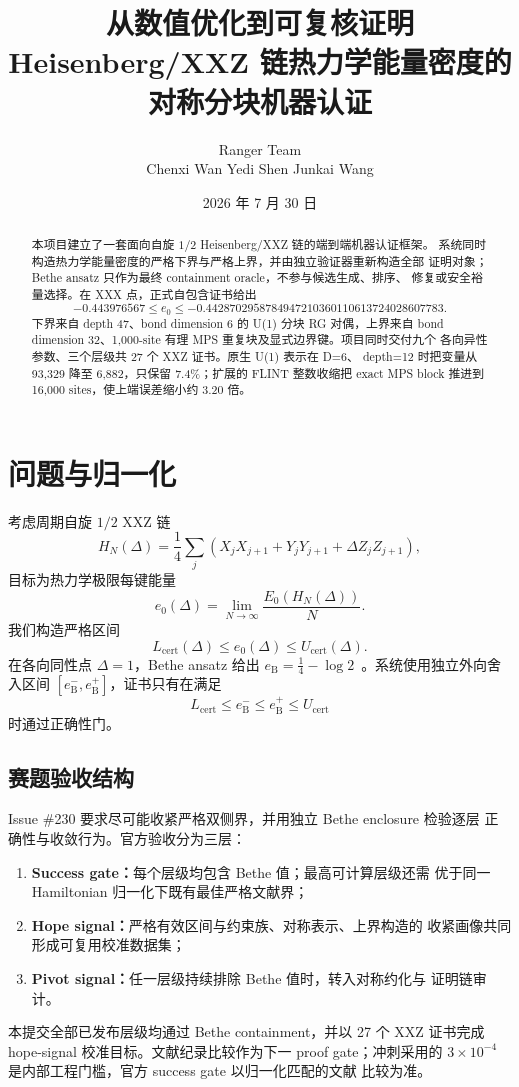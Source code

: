 \documentclass[UTF8,11pt,a4paper]{ctexart}
\title{
  \textbf{从数值优化到可复核证明}\\[0.45em]
  \large Heisenberg/XXZ 链热力学能量密度的对称分块机器认证
}
\author{Ranger Team\\Chenxi Wan \quad Yedi Shen \quad Junkai Wang}
\date{2026 年 7 月 30 日}
\newcommand{\cert}{\mathrm{cert}}
\newcommand{\eB}{e_{\mathrm B}}
\begin{document}
\maketitle

\begin{abstract}
本项目建立了一套面向自旋 $1/2$ Heisenberg/XXZ 链的端到端机器认证框架。
系统同时构造热力学能量密度的严格下界与严格上界，并由独立验证器重新构造全部
证明对象；Bethe ansatz 只作为最终 containment oracle，不参与候选生成、排序、
修复或安全裕量选择。在 XXX 点，正式自包含证书给出
\[
-0.443976567
\le e_0
\le
-0.4428702958784947210360110613724028607783.
\]
下界来自 depth 47、bond dimension 6 的 U(1) 分块 RG 对偶，上界来自 bond
dimension 32、1,000-site 有理 MPS 重复块及显式边界键。项目同时交付九个
各向异性参数、三个层级共 27 个 XXZ 证书。原生 U(1) 表示在 D=6、
depth=12 时把变量从 93,329 降至 6,882，只保留 7.4\%；扩展的 FLINT
整数收缩把 exact MPS block 推进到 16,000 sites，使上端误差缩小约 3.20 倍。
\end{abstract}

\section{问题与归一化}

考虑周期自旋 $1/2$ XXZ 链
\[
H_N(\Delta)=\frac14\sum_j
\left(
X_jX_{j+1}+Y_jY_{j+1}+\Delta Z_jZ_{j+1}
\right),
\]
目标为热力学极限每键能量
\[
e_0(\Delta)=\lim_{N\rightarrow\infty}\frac{E_0(H_N(\Delta))}{N}.
\]
我们构造严格区间
\[
L_{\cert}(\Delta)\le e_0(\Delta)\le U_{\cert}(\Delta).
\]
在各向同性点 $\Delta=1$，Bethe ansatz 给出
$\eB=\frac14-\log 2$~\cite{bethe1931}。系统使用独立外向舍入区间
$[\eB^{-},\eB^{+}]$，证书只有在满足
\[
L_{\cert}\le \eB^{-}\le \eB^{+}\le U_{\cert}
\]
时通过正确性门。

\subsection*{赛题验收结构}

Issue \#230 要求尽可能收紧严格双侧界，并用独立 Bethe enclosure 检验逐层
正确性与收敛行为。官方验收分为三层：
\begin{enumerate}
  \item \textbf{Success gate：}每个层级均包含 Bethe 值；最高可计算层级还需
  优于同一 Hamiltonian 归一化下既有最佳严格文献界；
  \item \textbf{Hope signal：}严格有效区间与约束族、对称表示、上界构造的
  收紧画像共同形成可复用校准数据集；
  \item \textbf{Pivot signal：}任一层级持续排除 Bethe 值时，转入对称约化与
  证明链审计。
\end{enumerate}
本提交全部已发布层级均通过 Bethe containment，并以 27 个 XXZ 证书完成
hope-signal 校准目标。文献纪录比较作为下一 proof gate；冲刺采用的
$3\times10^{-4}$ 是内部工程门槛，官方 success gate 以归一化匹配的文献
比较为准。
\end{document}
